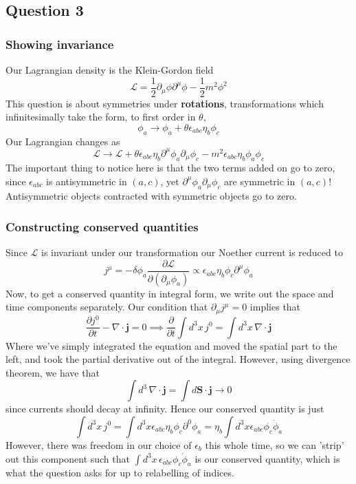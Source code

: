 \documentclass[11pt, oneside]{article}   	%
\theoremstyle{newline}
\theoremstyle{newline}
\theoremstyle{newline}
\theoremstyle{newline}
\theoremstyle{newline}
\begin{document}
\pagebreak
\subsection{Question 3}

\subsubsection*{Showing invariance}
Our Lagrangian density is the Klein-Gordon field 
\[ 
\mathcal{L}  = \frac{1}{ 2} \partial_\mu \phi \partial^\mu \phi  - \frac{1}{2} m^2 \phi^2 \] 
This question is about symmetries under \textbf{rotations}, transformations which infinitesimally take the form, to first order in $\theta$,  
\[ 
\phi_a \rightarrow \phi_a + \theta \epsilon_{abc} \eta_b \phi_c 
\] 
Our Lagrangian changes as 
\[ 
\mathcal{L } \rightarrow \mathcal{L} + \theta \epsilon_{abc} \eta_b \partial^\mu \phi_a \partial_\mu \phi_c - m^2 \epsilon_{abc} \eta_b \phi_a \phi_c 
\] 
The important thing to notice here is that the two terms added on go to zero, since $\epsilon_{abc} $ is antisymmetric in $(a, c)$, yet $\partial^\mu \phi_a \partial_\mu \phi_c$ are symmetric in $(a, c)$! Antisymmetric objects contracted with symmetric objects go to zero. 

\subsubsection*{Constructing conserved quantities}
Since $\mathcal{L } $ is invariant under our transformation our Noether current is reduced to \[ j^\mu =  - \delta \phi_a \frac{ \partial \mathcal{L} }{ \partial ( \partial_\mu \phi_ a) }  \propto \epsilon_{ abc} \eta_b \phi_c \partial^\mu \phi_a \] 
Now, to get a conserved quantity in integral form, we write out the space and time components separately. Our condition that $\partial_\mu j^\mu = 0 $ implies that 
\[ 
\frac{\partial j^0}{ \partial t}  - \nabla \cdot \mathbf{j}  = 0 \implies \frac{ \partial }{ \partial t} \int d^3 x \, j^0 = \int d^3 x \, \nabla \cdot \mathbf{ j } \] 
Where we've simply integrated the equation and moved the spatial part to the left, and took the partial derivative out of the integral. However, using divergence theorem, we have that 
\[ \int d^3 \, \nabla \cdot \mathbf{ j}  = \int d \mathbf{ S} \cdot \mathbf{j} \rightarrow 0 \] since currents should decay at infinity. Hence our conserved quantity is just 
\[ 	
\int d^3 x \, j^0  = \int d^3 x \epsilon_{ abc} \eta_b \phi_c \partial^0 \phi_a  = \eta_b \int d^3 x \epsilon_{abc} \phi_c \dot{ \phi}_a \] 
However, there was freedom in our choice of $\epsilon_b$ this whole time, so we can 'strip' out this component such that $\int d^3 x \, \epsilon_{ abc} \phi_c \dot{\phi}_a$ is our conserved quantity, which is what the question asks for up to relabelling of indices. 
\end{document}
